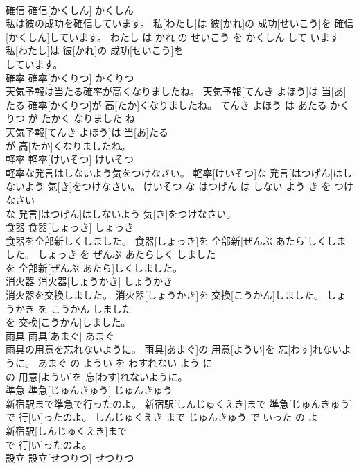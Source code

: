 \documentclass[8pt]{extreport}
\begin{document}
\begin{CJK}{UTF8}{min}
\\	確信	確信[かくしん]	かくしん	
\\	私は彼の成功を確信しています。	私[わたし]は 彼[かれ]の 成功[せいこう]を 確信[かくしん]しています。	わたし は かれ の せいこう を かくしん して います	
\\	私[わたし]は 彼[かれ]の 成功[せいこう]を
\\	しています。			
\\	確率	確率[かくりつ]	かくりつ	
\\	天気予報は当たる確率が高くなりましたね。	天気予報[てんき よほう]は 当[あ]たる 確率[かくりつ]が 高[たか]くなりましたね。	てんき よほう は あたる かくりつ が たかく なりました ね	
\\	天気予報[てんき よほう]は 当[あ]たる
\\	が 高[たか]くなりましたね。			
\\	軽率	軽率[けいそつ]	けいそつ	
\\	軽率な発言はしないよう気をつけなさい。	軽率[けいそつ]な 発言[はつげん]はしないよう 気[き]をつけなさい。	けいそつ な はつげん は しない よう き を つけなさい	
\\	な 発言[はつげん]はしないよう 気[き]をつけなさい。			
\\	食器	食器[しょっき]	しょっき	
\\	食器を全部新しくしました。	食器[しょっき]を 全部新[ぜんぶ あたら]しくしました。	しょっき を ぜんぶ あたらしく しました	
\\	を 全部新[ぜんぶ あたら]しくしました。			
\\	消火器	消火器[しょうかき]	しょうかき	
\\	消火器を交換しました。	消火器[しょうかき]を 交換[こうかん]しました。	しょうかき を こうかん しました	
\\	を 交換[こうかん]しました。			
\\	雨具	雨具[あまぐ]	あまぐ	
\\	雨具の用意を忘れないように。	雨具[あまぐ]の 用意[ようい]を 忘[わす]れないように。	あまぐ の ようい を わすれない よう に	
\\	の 用意[ようい]を 忘[わす]れないように。			
\\	準急	準急[じゅんきゅう]	じゅんきゅう	
\\	新宿駅まで準急で行ったのよ。	新宿駅[しんじゅくえき]まで 準急[じゅんきゅう]で 行[い]ったのよ。	しんじゅくえき まで じゅんきゅう で いった の よ	
\\	新宿駅[しんじゅくえき]まで
\\	で 行[い]ったのよ。			
\\	設立	設立[せつりつ]	せつりつ	

\end{CJK}
\end{document}
